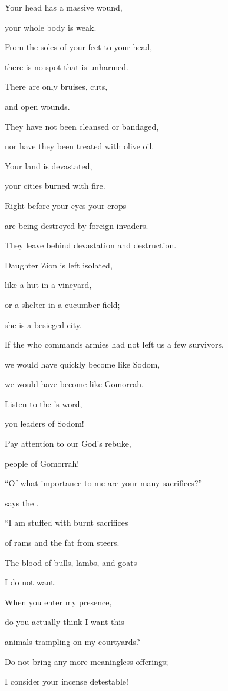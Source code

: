{\par }{\Q Your head
has a massive wound,
\par }{\Q your whole
body
is weak.
\par }{\Q {}From the soles
of your feet
to your head,
\par }{\Q there is no
spot that is unharmed.
\par }{\Q There are only bruises,
cuts,
\par }{\Q and open
wounds.
\par }{\Q They have not
been cleansed
or
bandaged,
\par }{\Q nor
have they been treated
with olive oil.
\par }{\Q {}Your land
is devastated,
\par }{\Q your cities
burned
with fire.
\par }{\Q Right before
your eyes your crops
\par }{\Q are being destroyed
by foreign invaders.
\par }{\Q They leave behind
devastation
and destruction.
\par }{\Q {}Daughter
Zion
is left isolated,
\par }{\Q like a hut
in a vineyard,
\par }{\Q or a shelter
in a cucumber field;
\par }{\Q she is a besieged
city.
\par }{\Q {}If
the {}
who commands armies
had not left
us a few
survivors,
\par }{\Q we would have quickly
become like Sodom,
\par }{\Q we
would have become
like Gomorrah.
\par }{\Q {}Listen
to the
{}’s
word,
\par }{\Q you leaders
of Sodom!

\par }{\Q Pay attention
to our God’s
rebuke,
\par }{\Q people
of Gomorrah!
\par }{\Q {}“Of what importance
to me are your many
sacrifices?”

\par }{\Q says
the {}.
\par }{\Q “I am stuffed
with burnt sacrifices
\par }{\Q of rams
and the fat
from steers.
\par }{\Q The blood
of bulls,
lambs,
and goats
\par }{\Q I do not
want.
\par }{\Q {}When
you enter
my presence,
\par }{\Q do you actually
think I want
this
–
\par }{\Q animals trampling
on my courtyards?
\par }{\Q {}Do not
bring
any more
meaningless offerings;
\par }{\Q I consider
your incense
detestable!

}
